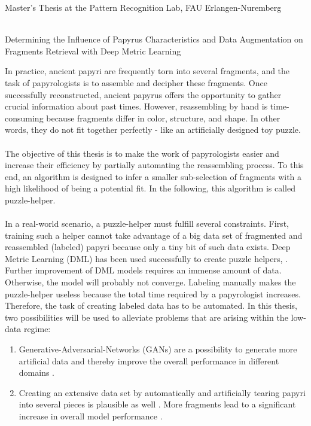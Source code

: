 \documentclass[12pt,a4paper]{article}
\begin{document}
\begin{center}
	Master's Thesis at the Pattern Recognition Lab, FAU Erlangen-Nuremberg 
																		
	\mbox{}\\
	{\Large Determining the Influence of Papyrus Characteristics and Data Augmentation on Fragments Retrieval with Deep Metric Learning}			
\end{center}
In practice, ancient papyri are frequently torn into several fragments, and the task of papyrologists is to assemble and decipher these fragments. Once successfully reconstructed, ancient papyrus offers the opportunity to gather crucial information about past times. However, reassembling by hand is time-consuming because fragments differ in color, structure, and shape. In other words, they do not fit together perfectly - like an artificially designed toy puzzle. 
\\\\
The objective of this thesis is to make the work of papyrologists easier and increase their efficiency by partially automating the reassembling process. To this end, an algorithm is designed to infer a smaller sub-selection of fragments with a high likelihood of being a potential fit. In the following, this algorithm is called puzzle-helper.
\\\\
In a real-world scenario, a puzzle-helper must fulfill several constraints. First, training such a helper cannot take advantage of a big data set of fragmented and reassembled (labeled) papyri because only a tiny bit of such data exists. Deep Metric Learning (DML) has been used successfully to create puzzle helpers, \cite{Ostertag21, Pirrone21}. Further improvement of DML models requires an immense amount of data. Otherwise, the model will probably not converge. Labeling manually makes the puzzle-helper useless because the total time required by a papyrologist increases. Therefore, the task of creating labeled data has to be automated. In this thesis, two possibilities will be used to alleviate problems that are arising within the low-data regime: 
\begin{enumerate}
	\item Generative-Adversarial-Networks (GANs) are a possibility to generate more artificial data and thereby improve the overall performance in different domains \cite{Tamrin21}.
	\item Creating an extensive data set by automatically and artificially tearing papyri into several pieces is plausible as well \cite{Seuret21}. More fragments lead to a significant increase in overall model performance \cite{Pirrone21, Ostertag21}.
\end{enumerate}
\end{document}
